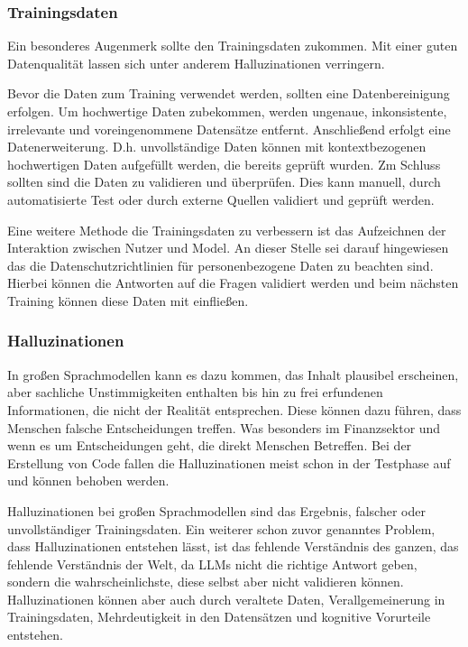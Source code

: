 \subsubsection{Trainingsdaten}
Ein besonderes Augenmerk sollte den Trainingsdaten zukommen. Mit einer guten Datenqualität lassen sich unter anderem Halluzinationen verringern. \vspace{0.2cm}

Bevor die Daten zum Training verwendet werden, sollten eine Datenbereinigung erfolgen. Um hochwertige Daten zubekommen, werden ungenaue, inkonsistente, irrelevante und voreingenommene Datensätze entfernt. Anschließend erfolgt eine Datenerweiterung. D.h. unvollständige Daten können mit kontextbezogenen hochwertigen Daten aufgefüllt werden, die bereits geprüft wurden. Zm Schluss sollten sind die Daten zu validieren und überprüfen. Dies kann manuell, durch automatisierte Test oder durch externe Quellen validiert und geprüft werden.\vspace{0.2cm}

Eine weitere Methode die Trainingsdaten zu verbessern ist das Aufzeichnen der Interaktion zwischen Nutzer und Model. An dieser Stelle sei darauf hingewiesen das die Datenschutzrichtlinien für personenbezogene Daten zu beachten sind. Hierbei können die Antworten auf die Fragen validiert werden und beim nächsten Training können diese Daten mit einfließen.


\subsubsection{Halluzinationen}
In großen Sprachmodellen kann es dazu kommen, das Inhalt plausibel erscheinen, aber sachliche Unstimmigkeiten enthalten bis hin zu frei erfundenen Informationen, die nicht der Realität entsprechen. Diese können dazu führen, dass Menschen falsche Entscheidungen treffen. Was besonders im Finanzsektor und wenn es um Entscheidungen geht, die direkt Menschen Betreffen. Bei der Erstellung von Code fallen die Halluzinationen meist schon in der Testphase auf und können behoben werden.\vspace{0.2cm}

Halluzinationen bei großen Sprachmodellen sind das Ergebnis, falscher oder unvollständiger Trainingsdaten. Ein weiterer schon zuvor genanntes Problem, dass Halluzinationen entstehen lässt, ist das fehlende Verständnis des ganzen, das fehlende Verständnis der Welt, da LLMs nicht die richtige Antwort geben, sondern die wahrscheinlichste, diese selbst aber nicht validieren können. Halluzinationen können aber auch durch veraltete Daten, Verallgemeinerung in Trainingsdaten, Mehrdeutigkeit in den Datensätzen und kognitive Vorurteile entstehen.\vspace{0.2cm}


